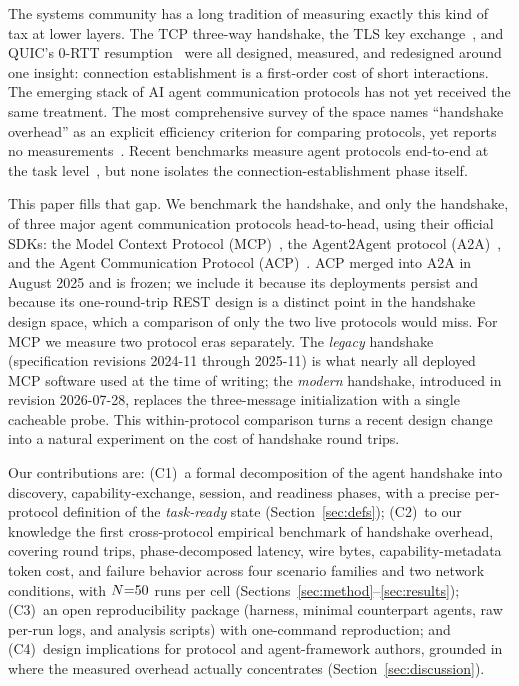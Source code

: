 \documentclass[10pt]{article}
\begin{document}
The systems community has a long tradition of measuring exactly this kind
of tax at lower layers. The TCP three-way handshake, the TLS key
exchange~\citep{rescorla2018tls,lee2021tls,naylor2014cost}, and QUIC's
0-RTT resumption~\citep{iyengar2021quic} were all designed, measured, and
redesigned around one insight: connection establishment is a first-order
cost of short interactions. The emerging stack of AI agent communication
protocols has not yet received the same treatment. The most comprehensive
survey of the space names ``handshake overhead'' as an explicit
efficiency criterion for comparing protocols, yet reports no
measurements~\citep{yang2025survey}. Recent benchmarks measure agent
protocols end-to-end at the task level~\citep{du2026protocolbench,
dobrovolskyi2026empirical}, but none isolates the
connection-establishment phase itself.

This paper fills that gap. We benchmark the handshake, and only the
handshake, of three major agent communication protocols head-to-head,
using their official SDKs: the Model Context Protocol
(MCP)~\citep{anthropic2024mcp,mcpspec2026}, the Agent2Agent protocol
(A2A)~\citep{a2aspec2026}, and the Agent Communication Protocol
(ACP)~\citep{acpspec2025}. ACP merged into A2A in August 2025 and is
frozen; we include it because its deployments persist and because its
one-round-trip REST design is a distinct point in the handshake design
space, which a comparison of only the two live protocols would miss. For
MCP we measure two protocol eras
separately. The \emph{legacy} handshake (specification revisions 2024-11
through 2025-11) is what nearly all deployed MCP software used at the
time of writing; the \emph{modern} handshake, introduced in revision
2026-07-28, replaces the three-message initialization with a single
cacheable probe. This within-protocol comparison turns a recent design
change into a natural experiment on the cost of handshake round trips.

Our contributions are:
(C1)~a formal decomposition of the agent handshake into discovery,
capability-exchange, session, and readiness phases, with a precise
per-protocol definition of the \emph{task-ready} state
(Section~\ref{sec:defs});
(C2)~to our knowledge the first cross-protocol empirical benchmark of
handshake overhead, covering round trips, phase-decomposed latency, wire
bytes, capability-metadata token cost, and failure behavior across four
scenario families and two network conditions, with $N{=}50$ runs per
cell (Sections~\ref{sec:method}--\ref{sec:results});
(C3)~an open reproducibility package (harness, minimal counterpart
agents, raw per-run logs, and analysis scripts) with one-command
reproduction; and
(C4)~design implications for protocol and agent-framework authors,
grounded in where the measured overhead actually concentrates
(Section~\ref{sec:discussion}).
\end{document}
